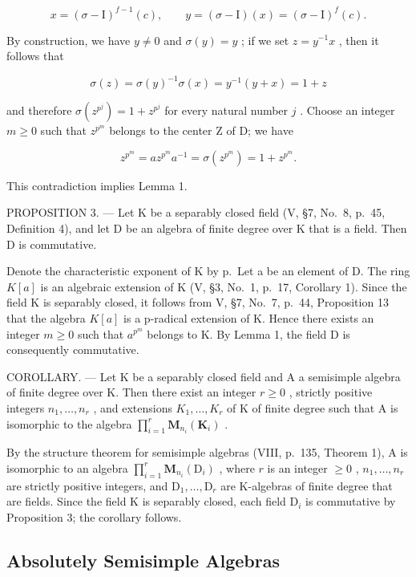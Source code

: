 \[
x = (\sigma - \mathrm{I}) ^ {f - 1} (c), \qquad y = (\sigma - \mathrm{I}) (x) = (\sigma - \mathrm{I}) ^ {f} (c).
\]

By construction, we have \(y \neq 0\) and \(\sigma(y) = y\) ; if we set \(z = y^{-1}x\) , then it follows that

\[
\sigma (z) = \sigma (y) ^ {- 1} \sigma (x) = y ^ {- 1} (y + x) = 1 + z
\]

and therefore \(\sigma(z^{p^j}) = 1 + z^{p^j}\) for every natural number \(j\) . Choose an integer \(m \geqslant 0\) such that \(z^{p^m}\) belongs to the center Z of D; we have

\[
z ^ {p ^ {m}} = a z ^ {p ^ {m}} a ^ {- 1} = \sigma (z ^ {p ^ {m}}) = 1 + z ^ {p ^ {m}}.
\]

This contradiction implies Lemma 1.

PROPOSITION 3. --- Let K be a separably closed field (V, §7, No.~8, p.~45, Definition 4), and let D be an algebra of finite degree over K that is a field. Then D is commutative.

Denote the characteristic exponent of K by p.~Let a be an element of D. The ring \(K[a]\) is an algebraic extension of K (V, §3, No.~1, p.~17, Corollary 1). Since the field K is separably closed, it follows from V, §7, No.~7, p.~44, Proposition 13 that the algebra \(K[a]\) is a p-radical extension of K. Hence there exists an integer \(m \geqslant 0\) such that \(a^{p^{m}}\) belongs to K. By Lemma 1, the field D is consequently commutative.

COROLLARY. --- Let K be a separably closed field and A a semisimple algebra of finite degree over K. Then there exist an integer \(r \geqslant 0\) , strictly positive integers \(n_{1}, \ldots, n_{r}\) , and extensions \(K_{1}, \ldots, K_{r}\) of K of finite degree such that A is isomorphic to the algebra \(\prod_{i=1}^{r} \mathbf{M}_{n_{i}}(\mathbf{K}_{i})\) .

By the structure theorem for semisimple algebras (VIII, p.~135, Theorem 1), A is isomorphic to an algebra \(\prod_{i=1}^{r} \mathbf{M}_{n_i}(\mathrm{D}_i)\) , where \(r\) is an integer \(\geqslant 0\) , \(n_1, \ldots, n_r\) are strictly positive integers, and \(\mathrm{D}_1, \ldots, \mathrm{D}_r\) are K-algebras of finite degree that are fields. Since the field K is separably closed, each field \(\mathrm{D}_i\) is commutative by Proposition 3; the corollary follows.

\subsection{Absolutely Semisimple Algebras}

